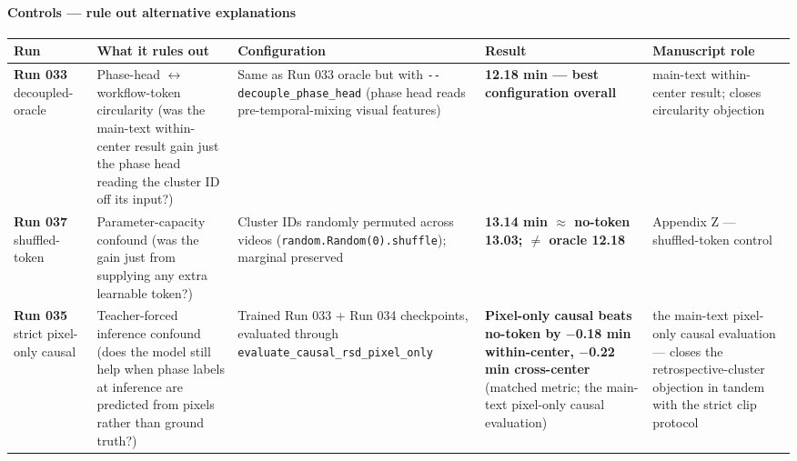 \paragraph{Controls --- rule out alternative
explanations}\label{controls-rule-out-alternative-explanations}

\begin{longtable}[]{@{}
  >{\raggedright\arraybackslash}p{}
  >{\raggedright\arraybackslash}p{}
  >{\raggedright\arraybackslash}p{}
  >{\raggedright\arraybackslash}p{}
  >{\raggedright\arraybackslash}p{}@{}}
\toprule\noalign{}
\begin{minipage}[b]{\linewidth}\raggedright
Run
\end{minipage} & \begin{minipage}[b]{\linewidth}\raggedright
What it rules out
\end{minipage} & \begin{minipage}[b]{\linewidth}\raggedright
Configuration
\end{minipage} & \begin{minipage}[b]{\linewidth}\raggedright
Result
\end{minipage} & \begin{minipage}[b]{\linewidth}\raggedright
Manuscript role
\end{minipage} \\
\midrule\noalign{}
\endhead
\bottomrule\noalign{}
\endlastfoot
\textbf{Run 033} decoupled-oracle & Phase-head $\leftrightarrow$ workflow-token
circularity (was the main-text within-center result gain just the phase head reading the cluster
ID off its input?) & Same as Run 033 oracle but with
\texttt{-\/-decouple\_phase\_head} (phase head reads pre-temporal-mixing
visual features) & \textbf{12.18 min --- best configuration overall} &
main-text within-center result; closes circularity objection \\
\textbf{Run 037} shuffled-token & Parameter-capacity confound (was the
gain just from supplying any extra learnable token?) & Cluster IDs
randomly permuted across videos (\texttt{random.Random(0).shuffle});
marginal preserved & \textbf{13.14 min $\approx$ no-token 13.03; $\neq$ oracle 12.18}
& Appendix Z --- shuffled-token control \\
\textbf{Run 035} strict pixel-only causal & Teacher-forced inference
confound (does the model still help when phase labels at inference are
predicted from pixels rather than ground truth?) & Trained Run 033 + Run
034 checkpoints, evaluated through
\texttt{evaluate\_causal\_rsd\_pixel\_only} & \textbf{Pixel-only causal
beats no-token by $-$0.18 min within-center, $-$0.22 min cross-center}
(matched metric; the main-text pixel-only causal evaluation) & the main-text pixel-only causal evaluation --- closes the retrospective-cluster
objection in tandem with the strict clip protocol \\
\end{longtable}

